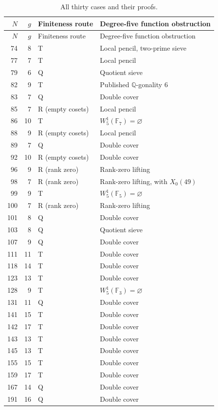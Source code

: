 \documentclass[11pt,a4paper]{article}
\newcommand{\Q}{\mathbb Q}
\newcommand{\F}{\mathbb F}
\begin{document}
\begin{longtable}{@{}rrll@{}}
\caption{All thirty cases and their proofs.}\label{tab:overview}\\
\toprule $N$&$g$&Finiteness route&Degree-five function obstruction\\
\midrule\endfirsthead
\toprule $N$&$g$&Finiteness route&Degree-five function obstruction\\
\midrule\endhead
74&8&T&Local pencil, two-prime sieve\\
77&7&T&Local pencil\\
79&6&Q&Quotient sieve\\
82&9&T&Published $\Q$-gonality $6$\\
83&7&Q&Double cover\\
85&7&R (empty cosets)&Local pencil\\
86&10&T&$W^1_5(\F_7)=\varnothing$\\
88&9&R (empty cosets)&Local pencil\\
89&7&Q&Double cover\\
92&10&R (empty cosets)&Double cover\\
96&9&R (rank zero)&Rank-zero lifting\\
98&7&R (rank zero)&Rank-zero lifting, with $X_0(49)$\\
99&9&T&$W^1_5(\F_5)=\varnothing$\\
100&7&R (rank zero)&Rank-zero lifting\\
101&8&Q&Double cover\\
103&8&Q&Quotient sieve\\
107&9&Q&Double cover\\
111&11&T&Double cover\\
118&14&T&Double cover\\
123&13&T&Double cover\\
128&9&T&$W^1_5(\F_3)=\varnothing$\\
131&11&Q&Double cover\\
141&15&T&Double cover\\
142&17&T&Double cover\\
143&13&T&Double cover\\
145&13&T&Double cover\\
155&15&T&Double cover\\
159&17&T&Double cover\\
167&14&Q&Double cover\\
191&16&Q&Double cover\\
\bottomrule
\end{longtable}
\end{document}
